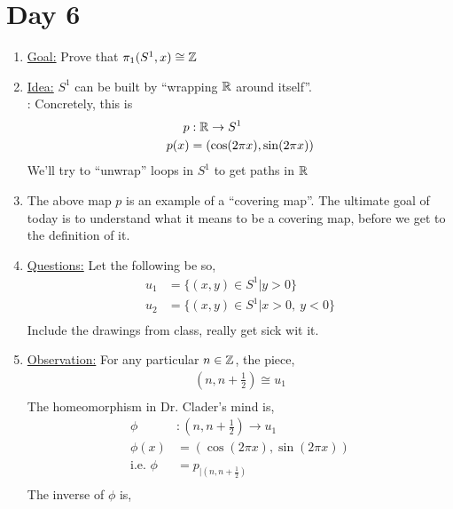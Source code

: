 \section{Day 6}
    \begin{enumerate}
        \item \underline{Goal:} Prove that $\pi_{1}(S^1, x)\cong \mathbb{Z}$
        \item \underline{Idea:} $S^1$ can be built by ``wrapping $\mathbb{R}$ around itself''.\\:
            Concretely, this is
            \begin{align*}
                p&: \mathbb{R} \rightarrow S^1\\
                p(x)&=(\cos(2\pi x), \sin(2\pi x))\\
            \end{align*}
            We'll try to ``unwrap'' loops in $S^1$ to get paths in $\mathbb{R}$
        \item
            The above map $p$ is an example of a ``covering map''. The ultimate goal of today is to understand
            what it means to be a covering map, before we get to the definition of it.\\
        \item \underline{Questions:} Let the following be so,
            \begin{align*}
                u_1&=\{(x,y)\in S^1| y>0\}\\
                u_2&=\{(x,y)\in S^1| x>0,\ y<0\}\\
            \end{align*}
            Include the drawings from class, really get sick wit it.
        \item \underline{Observation:} For any particular $n\in \mathbb{Z}$, the piece,
            \begin{align*}
                (n, n+\frac{1}{2})\cong u_1\\
            \end{align*}
            The homeomorphism in Dr. Clader's mind is,
            \begin{align*}
                \phi&: (n,n+\frac{1}{2})\rightarrow u_1\\
                \phi(x)&=(\cos(2\pi x), \sin(2\pi x))\\
                \text{i.e. } \phi&=p_{|(n,n+\frac{1}{2})}\\
            \end{align*}
            The inverse of $\phi$ is,

\end{enumerate}

